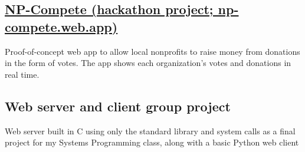 \documentclass[letterpaper,10pt]{article}
\begin{document}
\begin{minipage}[t]{\dimexpr.67\textwidth-.5\columnsep}
\subsection[NP-Compete]{\href{https://np-compete.web.app}{NP-Compete (hackathon project; np-compete.web.app)}}
Proof-of-concept web app to allow local nonprofits to raise money from donations in the form of votes. The app shows each organization's votes and donations in real time.


\subsection{Web server and client group project}
Web server built in C using only the standard library and system calls as a final project for my Systems Programming class, along with a basic Python web client




\end{minipage}
\end{document}
